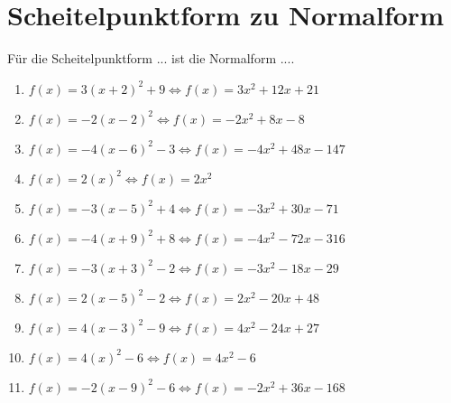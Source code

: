 \documentclass{article}%
\begin{document}
\section{Scheitelpunktform zu Normalform}%
\label{sec:ScheitelpunktformzuNormalform}%
Für die Scheitelpunktform ... ist die Normalform ....%
\begin{enumerate}[label=\alph*)]%
\item%
\newline\vspace{0.5cm}$f(x)=3(x+2)^2 +9\Leftrightarrow f(x)=3x^2 + 12x + 21$%
\item%
\newline\vspace{0.5cm}$f(x)=-2(x-2)^2\Leftrightarrow f(x)=-2x^2 + 8x - 8$%
\item%
\newline\vspace{0.5cm}$f(x)=-4(x-6)^2 -3\Leftrightarrow f(x)=-4x^2 + 48x - 147$%
\item%
\newline\vspace{0.5cm}$f(x)=2(x)^2\Leftrightarrow f(x)=2x^2$%
\item%
\newline\vspace{0.5cm}$f(x)=-3(x-5)^2 +4\Leftrightarrow f(x)=-3x^2 + 30x - 71$%
\item%
\newline\vspace{0.5cm}$f(x)=-4(x+9)^2 +8\Leftrightarrow f(x)=-4x^2 - 72x - 316$%
\item%
\newline\vspace{0.5cm}$f(x)=-3(x+3)^2 -2\Leftrightarrow f(x)=-3x^2 - 18x - 29$%
\item%
\newline\vspace{0.5cm}$f(x)=2(x-5)^2 -2\Leftrightarrow f(x)=2x^2 - 20x + 48$%
\item%
\newline\vspace{0.5cm}$f(x)=4(x-3)^2 -9\Leftrightarrow f(x)=4x^2 - 24x + 27$%
\item%
\newline\vspace{0.5cm}$f(x)=4(x)^2 -6\Leftrightarrow f(x)=4x^2 - 6$%
\item%
\newline\vspace{0.5cm}$f(x)=-2(x-9)^2 -6\Leftrightarrow f(x)=-2x^2 + 36x - 168$%

\end{enumerate}
\end{document}
